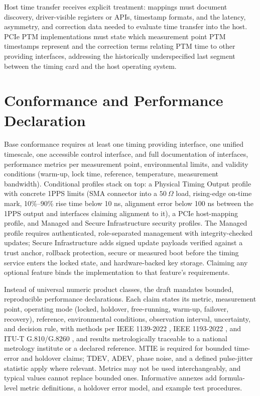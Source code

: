 \documentclass[
  conference,
  a4paper]{IEEEtran}
\begin{document}
Host time transfer receives explicit treatment: mappings must document
discovery, driver-visible registers or APIs, timestamp formats, and the
latency, asymmetry, and correction data needed to evaluate time transfer
into the host. PCIe PTM implementations must state which measurement
point PTM timestamps represent and the correction terms relating PTM
time to other providing interfaces, addressing the historically
underspecified last segment between the timing card and the host
operating system.

\section{Conformance and Performance
Declaration}\label{conformance-and-performance-declaration}

Base conformance requires at least one timing providing interface, one
unified timescale, one accessible control interface, and full
documentation of interfaces, performance metrics per measurement point,
environmental limits, and validity conditions (warm-up, lock time,
reference, temperature, measurement bandwidth). Conditional profiles
stack on top: a Physical Timing Output profile with concrete 1PPS limits
(SMA connector into a \(50~\Omega\) load, rising-edge on-time mark,
10\%--90\% rise time below 10 ns, alignment error below 100 ns between
the 1PPS output and interfaces claiming alignment to it), a PCIe
host-mapping profile, and Managed and Secure Infrastructure security
profiles. The Managed profile requires authenticated, role-separated
management with integrity-checked updates; Secure Infrastructure adds
signed update payloads verified against a trust anchor, rollback
protection, secure or measured boot before the timing service enters the
locked state, and hardware-backed key storage. Claiming any optional
feature binds the implementation to that feature's requirements.

Instead of universal numeric product classes, the draft mandates
bounded, reproducible performance declarations. Each claim states its
metric, measurement point, operating mode (locked, holdover,
free-running, warm-up, failover, recovery), reference, environmental
conditions, observation interval, uncertainty, and decision rule, with
methods per IEEE 1139-2022 \citep{ieee1139}, IEEE 1193-2022
\citep{ieee1193}, and ITU-T G.810/G.8260 \citep{itug8260}, and results
metrologically traceable to a national metrology institute or a declared
reference. MTIE is required for bounded time-error and holdover claims;
TDEV, ADEV, phase noise, and a defined pulse-jitter statistic apply
where relevant. Metrics may not be used interchangeably, and typical
values cannot replace bounded ones. Informative annexes add
formula-level metric definitions, a holdover error model, and example
test procedures.
\end{document}
